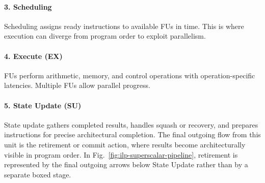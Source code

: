 \paragraph{3. Scheduling}\label{par:ilp-schedule}
Scheduling assigns ready instructions to available FUs in time.
This is where execution can diverge from program order to exploit parallelism.

\paragraph{4. Execute (EX)}\label{par:ilp-execute}
FUs perform arithmetic, memory, and control operations with operation-specific latencies.
Multiple FUs allow parallel progress.

\paragraph{5. State Update (SU)}\label{par:ilp-state-update}
State update gathers completed results, handles squash or recovery, and prepares instructions for precise architectural completion.
The final outgoing flow from this unit is the retirement or commit action, where results become architecturally visible in program order.
In Fig.~\ref{fig:ilp-superscalar-pipeline}, retirement is represented by the final outgoing arrows below State Update rather than by a separate boxed stage.

